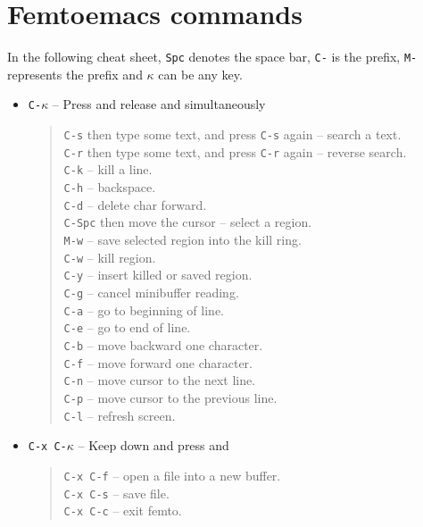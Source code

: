 \documentclass[a4paper,12pt]{book}
\begin{document}
\chapter{Femtoemacs commands}
In the following cheat sheet, \verb|Spc| denotes
the space bar, \verb|C-| is the  prefix, \verb|M-| represents 
the   prefix and  $\kappa$ can be any key. 
\begin{itemize}
\item \verb|C-|$\kappa$ -- Press and release 
and \keys{$\kappa$} simultaneously
\begin{quote}
 \verb|C-s| then type some text, and press \verb|C-s| again 
  -- search a text.\\
 \verb|C-r| then type some text, and press \verb|C-r| again 
  -- reverse search.\\
 \verb|C-k| -- kill a line.\\
 \verb|C-h| -- backspace.\\
 \verb|C-d| -- delete char forward.\\ 
 \verb|C-Spc| then move the cursor -- select a region.\\
 \verb|M-w| -- save selected region into the kill ring. \\
 \verb|C-w| -- kill region.\\
 \verb|C-y| -- insert killed or saved region.\\
 \verb|C-g| -- cancel minibuffer reading.\\
 \verb|C-a| -- go to beginning of line.\\
 \verb|C-e| -- go to end of line.\\
 \verb|C-b| -- move backward one character.\\
 \verb|C-f| -- move forward one character.\\
 \verb|C-n| -- move cursor to the next line.\\
 \verb|C-p| -- move cursor to the previous line.\\
 \verb|C-l| -- refresh screen.\\
\end{quote}
\item \verb|C-x C-|$\kappa$ -- Keep 
down and press  and  \keys{$\kappa$}
\begin{quote}
\verb|C-x C-f| -- open a file into a new buffer.\\
\verb|C-x C-s| -- save file.\\
\verb|C-x C-c| -- exit femto.
\end{quote}

\end{itemize}
\end{document}

